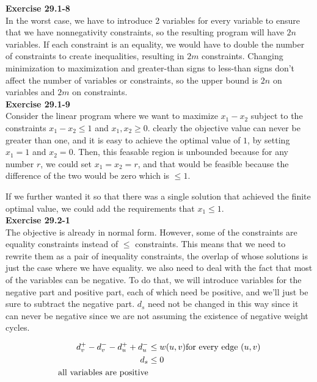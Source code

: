 \documentclass{article}
\begin{document}
\noindent\textbf{Exercise 29.1-8}\\

In the worst case, we have to introduce 2 variables for every variable to ensure that we have nonnegativity constraints, so the resulting program will have $2n$ variables.  If each constraint is an equality, we would have to double the number of constraints to create inequalities, resulting in $2m$ constraints.  Changing minimization to maximization and greater-than signs to less-than signs don't affect the number of variables or constraints, so the upper bound is $2n$ on variables and $2m$ on constraints. \\

\noindent\textbf{Exercise 29.1-9}\\

Consider the linear program where we want to maximize $x_1-x_2$ subject to the constraints $x_1-x_2 \le 1$ and $x_1,x_2\ge 0$. clearly the objective value can never be greater than one, and it is easy to achieve the optimal value of $1$, by setting $x_1 = 1$ and $x_2 = 0$. Then, this feasable region is unbounded because for any number $r$, we could set $x_1 = x_2 =r$, and that would be feasible because the difference of the two would be zero which is $\le 1$.

If we further wanted it so that there was a single solution that achieved the finite optimal value, we could add the requirements that $x_1 \le 1$.\\



\noindent\textbf{Exercise 29.2-1}\\

The objective is already in normal form. However, some of the constraints are equality constraints instead of $\le$ constraints. This means that we need to rewrite them as a pair of inequality constraints, the overlap of whose solutions is just the case where we have equality. we also need to deal with the fact that most of the variables can be negative. To do that, we will introduce variables for the negative part and positive part, each of which need be positive, and we'll just be sure to subtract the negative part. $d_s$ need not be changed in this way since it can never be negative since we are not assuming the existence of negative weight cycles.

\begin{align*}
d_v^+- d_v^- - d_u^+ +d_u^- &\le w(u,v) \hbox{for every edge $(u,v)$}\\
d_s &\le 0\\
\hbox{all variables are positive}
\end{align*}
\end{document}
